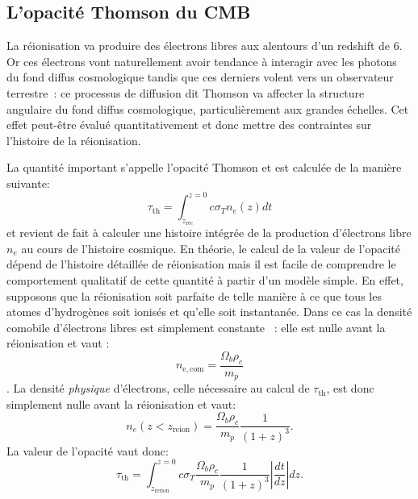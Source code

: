 \subsection{L'opacité Thomson du CMB}
La réionisation va produire des électrons libres aux alentours d'un redshift de 6. Or ces électrons vont naturellement avoir tendance à interagir avec les photons du fond diffus cosmologique tandis que ces derniers volent vers un observateur terrestre~: ce processus de diffusion dit Thomson va affecter la structure angulaire du fond diffus cosmologique, particulièrement aux grandes échelles. Cet effet peut-être évalué quantitativement et donc mettre des contraintes sur l'histoire de la réionisation.

La quantité important s'appelle l'opacité Thomson et est calculée de la manière suivante:
\begin{equation}
\tau_\mathrm{th}=\int_{z_\mathrm{rec}}^{z=0} c \sigma_T n_e(z) dt
\end{equation}
et revient de fait à calculer une histoire intégrée de la production d'électrons libre $n_e$ au cours de l'histoire cosmique. En théorie, le calcul de la valeur de l'opacité dépend de l'histoire détaillée de réionisation mais il est facile de comprendre le comportement qualitatif de cette quantité à partir d'un modèle simple. En effet, supposons que la réionisation soit parfaite de telle manière à ce que tous les atomes d'hydrogènes soit ionisés et qu'elle soit instantanée. Dans ce cas la densité comobile d'électrons libres est simplement constante ~: elle est nulle avant la réionisation et vaut :
\begin{equation}
n_\mathrm{e,com}=\frac{\Omega_b \rho_c}{m_p}
\end{equation}.
La densité \textit{physique} d'électrons, celle nécessaire au calcul de $\tau_\mathrm{th}$, est donc simplement nulle avant la réionisation et vaut:
\begin{equation}
n_e(z<z_\mathrm{reion})=\frac{\Omega_b \rho_c}{m_p} \frac{1}{(1+z)^3}.
\end{equation}
La valeur de l'opacité vaut donc:
\begin{equation}
\tau_\mathrm{th}=\int_{z_\mathrm{rerion}}^{z=0} c \sigma_T\frac{\Omega_b \rho_c}{m_p} \frac{1}{(1+z)^3}  |\frac{dt}{dz}| dz.
\end{equation}
